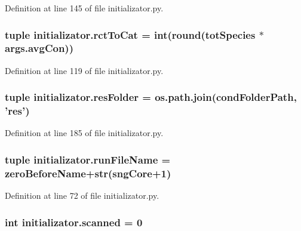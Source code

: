 Definition at line 145 of file initializator.\+py.

\hypertarget{a00137_afee9c574290c862d3ad8a51a77b2a72e}{
\subsubsection[{rct\+To\+Cat}]{\setlength{\rightskip}{0pt plus 5cm}tuple initializator.\+rct\+To\+Cat = int(round({\bf tot\+Species} $\ast$ args.\+avg\+Con))}}\label{a00137_afee9c574290c862d3ad8a51a77b2a72e}


Definition at line 119 of file initializator.\+py.

\hypertarget{a00137_ae3ceb468287bbef82c0134b3eeea4419}{
\subsubsection[{res\+Folder}]{\setlength{\rightskip}{0pt plus 5cm}tuple initializator.\+res\+Folder = os.\+path.\+join({\bf cond\+Folder\+Path}, 'res')}}\label{a00137_ae3ceb468287bbef82c0134b3eeea4419}


Definition at line 185 of file initializator.\+py.

\hypertarget{a00137_a47868487619848c8ead2458c6855426a}{
\subsubsection[{run\+File\+Name}]{\setlength{\rightskip}{0pt plus 5cm}tuple initializator.\+run\+File\+Name = {\bf zero\+Before\+Name}+str(sng\+Core+1)}}\label{a00137_a47868487619848c8ead2458c6855426a}


Definition at line 72 of file initializator.\+py.

\hypertarget{a00137_afafc4f533cad86cb7fd1b6fe5ed9effa}{
\subsubsection[{scanned}]{\setlength{\rightskip}{0pt plus 5cm}int initializator.\+scanned = 0}}\label{a00137_afafc4f533cad86cb7fd1b6fe5ed9effa}


